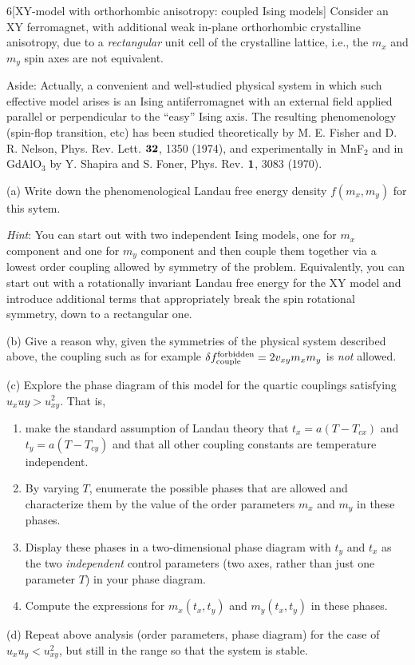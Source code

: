 \documentclass[12pt]{article}
\begin{document}
\begin{problem}{6}[XY-model with orthorhombic anisotropy: coupled Ising models]
Consider an XY ferromagnet, with additional weak in-plane orthorhombic
crystalline anisotropy, due to a \textit{rectangular} unit cell of the
crystalline lattice, i.e., the $m_x$ and $m_y$ spin axes are not equivalent.

Aside: Actually, a convenient and well-studied physical system in which such
effective model arises is an Ising antiferromagnet with an external field
applied parallel or perpendicular to the ``easy'' Ising axis. The resulting
phenomenology (spin-flop transition, etc) has been studied theoretically by M.
E. Fisher and D. R. Nelson, Phys. Rev. Lett. $\vb{32}$, 1350 (1974), and
experimentally in MnF$_2$ and in GdAlO$_3$ by Y. Shapira and S. Foner, Phys.
Rev. $\vb{1}$, 3083 (1970).

(a) Write down the phenomenological Landau free energy density $f(m_x,m_y)$ for
this sytem.

\textit{Hint}: You can start out with two independent Ising models, one for
$m_x$ component and one for $m_y$ component and then couple them together via a
lowest order coupling allowed by symmetry of the problem. Equivalently, you can
start out with a rotationally invariant Landau free energy for the XY model and
introduce additional terms that appropriately break the spin rotational
symmetry, down to a rectangular one.

(b) Give a reason why, given the symmetries of the physical system described
above, the coupling such as for example $\delta
f_{\text{couple}}^{\text{forbidden}}=2v_{xy}m_xm_y$ is \textit{not} allowed.

(c) Explore the phase diagram of this model for the quartic couplings satisfying
$u_xuy>u_{xy}^2$. That is,

\begin{enumerate}[label=(\roman*)]
    \item make the standard assumption of Landau theory that $t_x=a(T-T_{cx})$
        and $t_y=a(T-T_{cy})$ and that all other coupling constants are
        temperature independent. 
    \item By varying $T$, enumerate the possible phases that are allowed and
        characterize them by the value of the order parameters $m_x$ and $m_y$
        in these phases.
    \item Display these phases in a two-dimensional phase diagram with $t_y$ and
        $t_x$ as the two \textit{independent} control parameters (two axes,
        rather than just one parameter $T$) in your phase diagram.
    \item Compute the expressions for $m_x(t_x,t_y)$ and $m_y(t_x,t_y)$ in these
        phases.
\end{enumerate}

(d) Repeat above analysis (order parameters, phase diagram) for the case of
$u_xu_y<u_{xy}^2$, but still in the range so that the system is stable.
\begin{solution}
\end{solution}
\end{problem}
\end{document}
